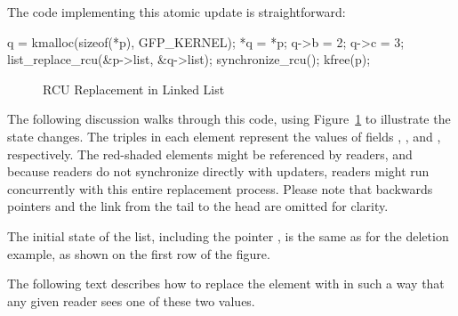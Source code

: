 The code implementing this atomic update is straightforward:

\begin{fcvlabel}
\begin{VerbatimN}[samepage=true,commandchars=\\\[\],firstnumber=15]
q = kmalloc(sizeof(*p), GFP_KERNEL);	\lnlbl[kmalloc]
*q = *p;				\lnlbl[copy]
q->b = 2;				\lnlbl[update1]
q->c = 3;				\lnlbl[update2]
list_replace_rcu(&p->list, &q->list);	\lnlbl[replace]
synchronize_rcu();			
kfree(p);				\lnlbl[kfree]
\end{VerbatimN}
\end{fcvlabel}

\begin{figure}[tbp]
\centering
{}
\caption{RCU Replacement in Linked List}
\label{fig:defer:RCU Replacement in Linked List}
\end{figure}

The following discussion walks through this code, using
Figure~\ref{fig:defer:RCU Replacement in Linked List} to illustrate
the state changes.
The triples in each element represent the values of fields ,
, and , respectively.
The red-shaded elements might be referenced by readers,
and because readers do not synchronize directly with updaters,
readers might run concurrently with this entire replacement process.
Please note that backwards pointers and the link from the tail to the
head are omitted for clarity.

The initial state of the list, including the pointer ,
is the same as for the deletion example, as shown on the
first row of the figure.

The following text describes how to replace the  element
with  in such a way that any given reader sees one of these
two values.

